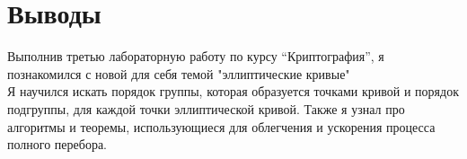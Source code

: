 \section{Выводы}
Выполнив третью лабораторную работу по курсу \enquote{Криптография}, я познакомился с новой для себя темой "эллиптические кривые" \\

Я научился искать порядок группы, которая образуется точками кривой и порядок подгруппы, для каждой точки эллиптической кривой. Также я узнал про алгоритмы и теоремы, использующиеся для облегчения и ускорения процесса полного перебора.



